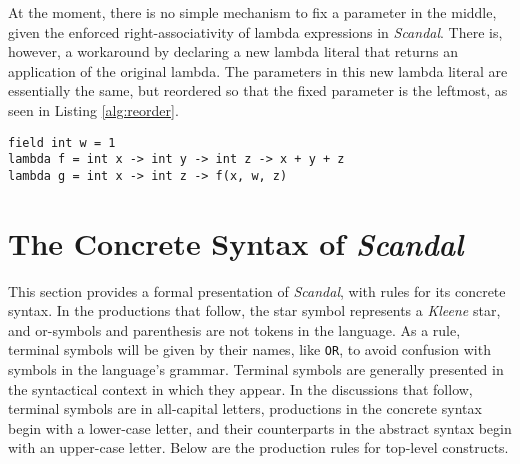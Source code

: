 At the moment, there is no simple mechanism to fix a parameter in the middle, given the enforced right-associativity of lambda expressions in \emph{Scandal}. There is, however, a workaround by declaring a new lambda literal that returns an application of the original lambda. The parameters in this new lambda literal are essentially the same, but reordered so that the fixed parameter is the leftmost, as seen in Listing \ref{alg:reorder}.

\begin{lstlisting}[emph={field,int,lambda,print},emphstyle={\textbf},caption={Right associativity of lambda expressions.},label={alg:reorder}]
field int w = 1
lambda f = int x -> int y -> int z -> x + y + z
lambda g = int x -> int z -> f(x, w, z)
\end{lstlisting}

\section{The Concrete Syntax of \emph{Scandal}}

This section provides a formal presentation of \emph{Scandal}, with rules for its concrete syntax. In the productions that follow, the star symbol represents a \emph{Kleene} star, and or-symbols and parenthesis are not tokens in the language. As a rule, terminal symbols will be given by their names, like \texttt{OR}, to avoid confusion with symbols in the language's grammar. Terminal symbols are generally presented in the syntactical context in which they appear. In the discussions that follow, terminal symbols are in all-capital letters, productions in the concrete syntax begin with a lower-case letter, and their counterparts in the abstract syntax begin with an upper-case letter. Below are the production rules for top-level constructs.

